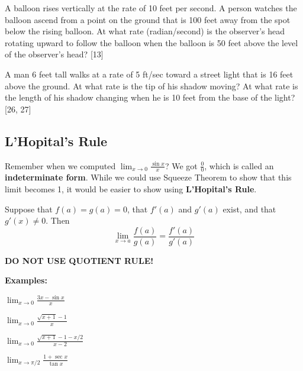 \documentclass[addpoints, 12pt]{exam}
\begin{document}
\begin{questions}
    
    \question A balloon rises vertically at the rate of 10 feet per second.  A person watches the balloon ascend from a point on the ground that is 100 feet away from the spot below the rising balloon.  At what rate (radian/second) is the observer’s head rotating upward to follow the balloon when the balloon is 50 feet above the level of the observer’s head?  [13]
    
    \question A man 6 feet tall walks at a rate of 5 ft/sec toward a street light that is 16 feet above the ground.  At what rate is the tip of his shadow moving?  At what rate is the length of his shadow changing when he is 10 feet from the base of the light? [26, 27]
    
    
    
\end{questions}






\newpage
{}
\subsection*{L'Hopital's Rule}
Remember when we computed $\displaystyle\lim_{x\to0}\frac{\sin x}{x}$? We got $\frac{0}{0}$, which is called an \textbf{indeterminate form}. While we could use Squeeze Theorem to show that this limit becomes 1, it would be easier to show using \textbf{L'Hopital's Rule}.

\begin{tcolorbox}[title= L'HOPITAL'S RULE,black,sharp corners,colback=white,colbacktitle=white,coltitle=black,boxrule=1pt]

    Suppose that $f(a)=g(a)=0$, that $f'(a)$ and $g'(a)$ exist, and that $g'(x)\ne0$. Then
    \[\lim_{x\to a}\frac{f(a)}{g(a)}=\frac{f'(a)}{g'(a)}\]
    
\end{tcolorbox}

\begin{center}
    \textbf{\large DO NOT USE QUOTIENT RULE!}
\end{center}
\noindent\textbf{Examples:}
\begin{questions}
    \question $\displaystyle \lim_{x\to0}\frac{3x-\sin x}{x}$
    
    \question $\displaystyle \lim_{x\to0}\frac{\sqrt{x+1}-1}{x}$
    
    \question $\displaystyle \lim_{x\to0}\frac{\sqrt{x+1}-1-x/2}{x-2}$
    
    \question $\displaystyle \lim_{x\to\pi/2}\frac{1+\sec x}{\tan x}$
\end{questions}
\end{document}
